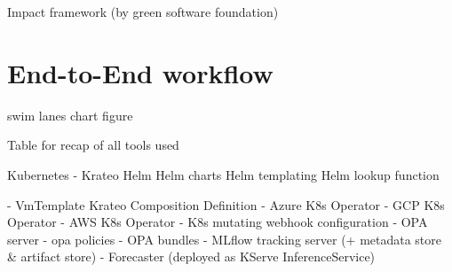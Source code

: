 Impact framework (by green software foundation)







\section{End-to-End workflow}
\label{sec:e2eflow}

swim lanes chart figure







Table for recap of all tools used

Kubernetes
- Krateo
Helm
    Helm charts
    Helm templating
    Helm lookup function

- VmTemplate Krateo Composition Definition
- Azure K8s Operator
- GCP K8s Operator
- AWS K8s Operator
- K8s mutating webhook configuration
- OPA server
- opa policies
- OPA bundles
- MLflow tracking server (+ metadata store & artifact store)
- Forecaster (deployed as KServe InferenceService)


\newpage

